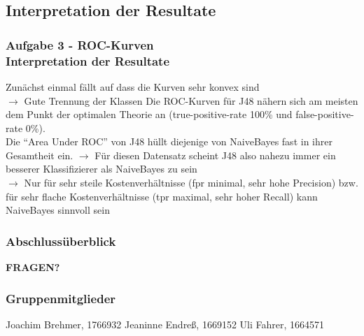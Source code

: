 \documentclass[accentcolor=tud6b,colorbacktitle,inverttitle,landscape,german,presentation,t]{tudbeamer}
\begin{document}
    \subsection{Interpretation der Resultate}
    
    \begin{frame}[t]
    \frametitle{Aufgabe 3 - ROC-Kurven\\ Interpretation der Resultate}
        Zunächst einmal fällt auf dass die Kurven sehr konvex sind\\
        $\rightarrow$ Gute Trennung der Klassen
        \vfill 
        Die ROC-Kurven für J48 nähern sich am meisten dem Punkt der optimalen Theorie an (true-positive-rate 100\% und false-positive-rate 0\%).\\
        Die ``Area Under ROC'' von J48 hüllt diejenige von NaiveBayes fast in ihrer Gesamtheit ein.
        \vfill
        $\rightarrow$ Für diesen Datensatz scheint J48 also nahezu immer ein besserer Klassifizierer als NaiveBayes zu sein\\
        $\rightarrow$ Nur für sehr steile Kostenverhältnisse (fpr minimal, sehr hohe Precision) bzw. für sehr flache Kostenverhältnisse (tpr maximal, sehr hoher Recall) kann NaiveBayes sinnvoll sein
    \end{frame}

\begin{frame}
\frametitle{Abschlussüberblick}
\tableofcontents
\begin{center}
\textbf{\Large FRAGEN?}
\end{center}
\end{frame}

\begin{frame}
\frametitle{Gruppenmitglieder}
Joachim Brehmer, 1766932 \vfill
Jeaninne Endreß, 1669152 \vfill
Uli Fahrer, 1664571
\end{frame}
\end{document}
